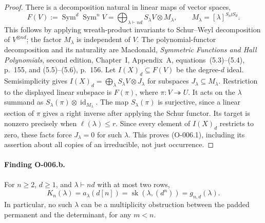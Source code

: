 \begin{proof}
There is a decomposition natural in linear maps of vector spaces,
\[
 F(V):=\operatorname{Sym}^d\operatorname{Sym}^n V
       =\bigoplus_{\lambda\vdash nd}S_\lambda V\otimes M_\lambda,
 \qquad M_\lambda=[\lambda]^{S_n\wr S_d}.
\]
This follows by applying wreath-product invariants to Schur--Weyl
decomposition of $V^{\otimes nd}$; the factor $M_\lambda$ is independent
of $V$. The polynomial-functor decomposition and its naturality are
Macdonald, \emph{Symmetric Functions and Hall Polynomials}, second
edition, Chapter~I, Appendix~A, equations~(5.3)--(5.4), p.~155, and
(5.5)--(5.6), p.~156. Let $I(X)_d\subseteq F(V)$ be the degree-$d$ ideal.
Semisimplicity gives
$I(X)_d=\bigoplus_\lambda S_\lambda V\otimes J_\lambda$
for subspaces $J_\lambda\subseteq M_\lambda$.
Restriction to the displayed linear subspace is $F(\pi)$, where
$\pi:V\twoheadrightarrow U$. It acts on the $\lambda$ summand as
$S_\lambda(\pi)\otimes\operatorname{id}_{M_\lambda}$.
The map $S_\lambda(\pi)$ is surjective, since a linear section of
$\pi$ gives a right inverse after applying the Schur functor.
Its target is nonzero precisely when $\ell(\lambda)\leq r$.
Since every element of $I(X)_d$ restricts to zero, these facts force
$J_\lambda=0$ for such $\lambda$. This proves (O-006.1), including
its assertion about all copies of an irreducible, not just occurrence.
\end{proof}

\paragraph{Finding O-006.b.}
For $n\geq2$, $d\geq1$, and $\lambda\vdash nd$ with at most two
rows,
\[
 K_n(\lambda)=a_\lambda(d[n])
             =\operatorname{sk}(\lambda,(d^n))
             =g_{n,d}(\lambda).                         \tag{O-006.2}
\]
In particular, no such $\lambda$ can be a multiplicity obstruction
between the padded permanent and the determinant, for any $m<n$.

